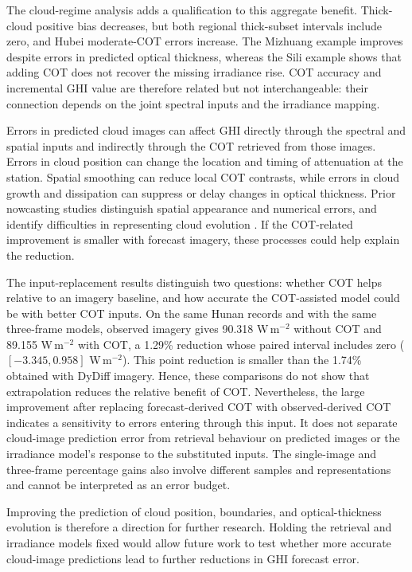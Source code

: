 \documentclass[11pt]{article}
\begin{document}
The cloud-regime analysis adds a qualification to this aggregate benefit. Thick-cloud positive bias decreases, but both regional thick-subset intervals include zero, and Hubei moderate-COT errors increase. The Mizhuang example improves despite errors in predicted optical thickness, whereas the Sili example shows that adding COT does not recover the missing irradiance rise. COT accuracy and incremental GHI value are therefore related but not interchangeable: their connection depends on the joint spectral inputs and the irradiance mapping.

Errors in predicted cloud images can affect GHI directly through the spectral and spatial inputs and indirectly through the COT retrieved from those images. Errors in cloud position can change the location and timing of attenuation at the station. Spatial smoothing can reduce local COT contrasts, while errors in cloud growth and dissipation can suppress or delay changes in optical thickness. Prior nowcasting studies distinguish spatial appearance and numerical errors, and identify difficulties in representing cloud evolution \cite{chen2024,cui2024}. If the COT-related improvement is smaller with forecast imagery, these processes could help explain the reduction.

The input-replacement results distinguish two questions: whether COT helps relative to an imagery baseline, and how accurate the COT-assisted model could be with better COT inputs. On the same Hunan records and with the same three-frame models, observed imagery gives 90.318 W\,m$^{-2}$ without COT and 89.155 W\,m$^{-2}$ with COT, a 1.29\% reduction whose paired interval includes zero ($[-3.345,0.958]$ W\,m$^{-2}$). This point reduction is smaller than the 1.74\% obtained with DyDiff imagery. Hence, these comparisons do not show that extrapolation reduces the relative benefit of COT. Nevertheless, the large improvement after replacing forecast-derived COT with observed-derived COT indicates a sensitivity to errors entering through this input. It does not separate cloud-image prediction error from retrieval behaviour on predicted images or the irradiance model's response to the substituted inputs. The single-image and three-frame percentage gains also involve different samples and representations and cannot be interpreted as an error budget.

Improving the prediction of cloud position, boundaries, and optical-thickness evolution is therefore a direction for further research. Holding the retrieval and irradiance models fixed would allow future work to test whether more accurate cloud-image predictions lead to further reductions in GHI forecast error.
\end{document}
